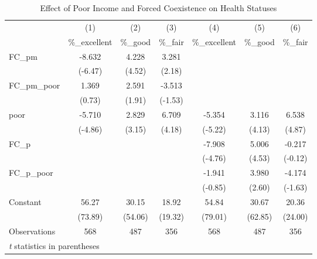 \documentclass[12pt]{article}
\begin{document}
\begin{table}[htbp]\centering \caption{Effect of Poor Income and Forced Coexistence on Health Statuses\label{poorfc}} \begin{tabular}{l*{6}{c}} \toprule
                    &\multicolumn{1}{c}{(1)}&\multicolumn{1}{c}{(2)}&\multicolumn{1}{c}{(3)}&\multicolumn{1}{c}{(4)}&\multicolumn{1}{c}{(5)}&\multicolumn{1}{c}{(6)}\\
                    &\multicolumn{1}{c}{\%\_excellent}&\multicolumn{1}{c}{\%\_good}&\multicolumn{1}{c}{\%\_fair}&\multicolumn{1}{c}{\%\_excellent}&\multicolumn{1}{c}{\%\_good}&\multicolumn{1}{c}{\%\_fair}\\
\midrule
FC\_pm           &      -8.632&       4.228&       3.281&            &            &            \\
                    &     (-6.47)&      (4.52)&      (2.18)&            &            &            \\
\addlinespace
FC\_pm\_poor      &       1.369&       2.591&      -3.513&            &            &            \\
                    &      (0.73)&      (1.91)&     (-1.53)&            &            &            \\
\addlinespace
poor         &      -5.710&       2.829&       6.709&      -5.354&       3.116&       6.538\\
                    &     (-4.86)&      (3.15)&      (4.18)&     (-5.22)&      (4.13)&      (4.87)\\
\addlinespace
FC\_p            &            &            &            &      -7.908&       5.006&      -0.217\\
                    &            &            &            &     (-4.76)&      (4.53)&     (-0.12)\\
\addlinespace
FC\_p\_poor       &            &            &            &      -1.941&       3.980&      -4.174\\
                    &            &            &            &     (-0.85)&      (2.60)&     (-1.63)\\
\addlinespace
Constant            &       56.27&       30.15&       18.92&       54.84&       30.67&       20.36\\
                    &     (73.89)&     (54.06)&     (19.32)&     (79.01)&     (62.85)&     (24.00)\\
\midrule
Observations        &         568&         487&         356&         568&         487&         356\\
\bottomrule
\multicolumn{7}{l}{\footnotesize \textit{t} statistics in parentheses}\\
\end{tabular}
\end{table}
\end{document}
